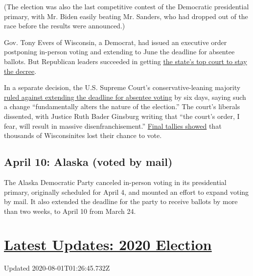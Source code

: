 (The election was also the last competitive contest of the Democratic
presidential primary, with Mr. Biden easily beating Mr. Sanders, who had
dropped out of the race before the results were announced.)

Gov. Tony Evers of Wisconsin, a Democrat, had issued an executive order
postponing in-person voting and extending to June the deadline for
absentee ballots. But Republican leaders succeeded in getting
\href{https://www.nytimes.com/2020/04/06/us/politics/wisconsin-primary-voting-coronavirus.html}{the
state's top court to stay the decree}.

In a separate decision, the U.S. Supreme Court's conservative-leaning
majority
\href{https://www.nytimes.com/2020/04/06/us/politics/supreme-court-voting-wisconsin-virus.html}{ruled
against extending the deadline for absentee voting} by six days, saying
such a change ``fundamentally alters the nature of the election.'' The
court's liberals dissented, with Justice Ruth Bader Ginsburg writing
that ``the court's order, I fear, will result in massive
disenfranchisement.''
\href{https://www.nytimes.com/2020/04/13/us/wisconsin-election-voting-rights.html}{Final
tallies showed} that thousands of Wisconsinites lost their chance to
vote.

\hypertarget{april-10-alaska-voted-by-mail}{%
\subsection{April 10: Alaska (voted by
mail)}\label{april-10-alaska-voted-by-mail}}

The Alaska Democratic Party canceled in-person voting in its
presidential primary, originally scheduled for April 4, and mounted an
effort to expand voting by mail. It also extended the deadline for the
party to receive ballots by more than two weeks, to April 10 from March
24.

\hypertarget{latest-updates-2020-election}{%
\section{\texorpdfstring{\href{https://www.nytimes.com/2020/07/31/us/elections/biden-vs-trump.html?action=click\&pgtype=Article\&state=default\&region=MAIN_CONTENT_1\&context=storylines_live_updates}{Latest
Updates: 2020
Election}}{Latest Updates: 2020 Election}}\label{latest-updates-2020-election}}

Updated 2020-08-01T01:26:45.732Z

